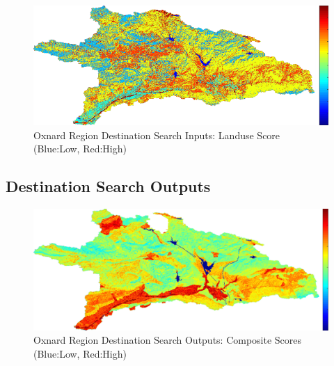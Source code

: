         \begin{figure}[!h]
            \begin{center}
            \includegraphics[width=5.5in]{figures/Oxnard_Search_Landuse.png}   
            \caption{Oxnard Region Destination Search Inputs: Landuse Score (Blue:Low, Red:High)}
            \label{fig:Odsinputs_landuse}
            \end{center}
        \end{figure}
    
    \subsection{Destination Search Outputs}
    
        \begin{figure}[!h]
            \begin{center}
            \includegraphics[width=5.5in]{figures/Oxnard_Search_Composite.png}   
            \caption{Oxnard Region Destination Search Outputs: Composite Scores (Blue:Low, Red:High)}
            \label{fig:Odsoutputs_comp}
            \end{center}
        \end{figure}
        
